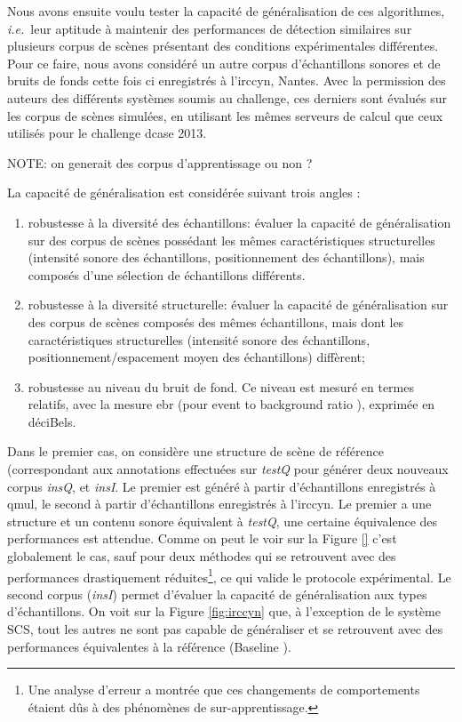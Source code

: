 Nous avons ensuite voulu tester la capacité de généralisation de ces algorithmes, \textit{i.e.}~leur aptitude à maintenir des performances de détection similaires sur plusieurs corpus de scènes présentant des conditions expérimentales différentes. Pour ce faire, nous avons considéré un autre corpus d'échantillons sonores et de bruits de fonds  cette fois ci enregistrés à l'irccyn, Nantes. Avec la permission des auteurs des différents systèmes soumis au challenge, ces derniers sont évalués sur les corpus de scènes simulées, en utilisant les mêmes serveurs de calcul que ceux utilisés pour le challenge dcase 2013.

NOTE: on generait des corpus d'apprentissage ou non ?

La capacité de généralisation est considérée suivant trois angles :
\begin{enumerate}
\item robustesse à la diversité des échantillons: évaluer la capacité de généralisation sur des corpus de scènes possédant les mêmes caractéristiques structurelles (intensité sonore des échantillons, positionnement des échantillons), mais composés d'une sélection de échantillons différents.
\item robustesse à la diversité structurelle: évaluer la capacité de généralisation sur des corpus de scènes composés des mêmes échantillons, mais dont les caractéristiques structurelles (intensité sonore des échantillons, positionnement/espacement moyen des échantillons) diffèrent;
\item robustesse au niveau du bruit de fond. Ce niveau est mesuré en termes relatifs, avec la mesure ebr (pour \og event to background ratio \fg), exprimée en déciBels.
\end{enumerate}

Dans le premier cas, on considère une structure de scène de référence (correspondant aux annotations effectuées sur \emph{testQ} pour générer deux nouveaux corpus \emph{insQ}, et \emph{insI}. Le premier est généré à partir d'échantillons enregistrés à qmul, le second à partir d'échantillons enregistrés à l'irccyn. Le premier a une structure et un contenu sonore équivalent à \emph{testQ}, une certaine équivalence des performances est attendue. Comme on peut le voir sur la Figure \ref{} c'est globalement le cas, sauf pour deux méthodes qui se retrouvent avec des performances drastiquement réduites\footnote{Une analyse d'erreur a montrée que ces changements de comportements étaient dûs à des phénomènes de sur-apprentissage\cite{lafayhal-01111381}.}, ce qui valide le protocole expérimental. Le second corpus (\emph{insI}) permet d'évaluer la capacité de généralisation aux types d'échantillons. On voit sur la Figure \ref{fig:irccyn} que, à l'exception de le système SCS, tout les autres ne sont pas capable de généraliser et se retrouvent avec des performances équivalentes à la référence (\og Baseline \fg).

